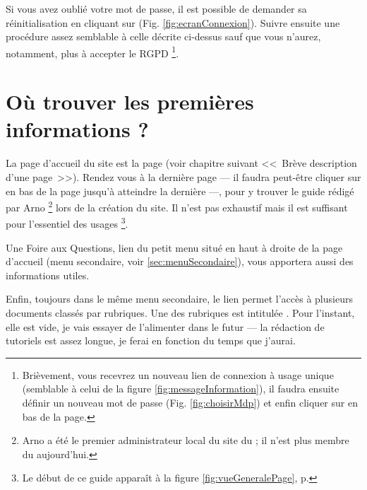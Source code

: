 
\label{sec:mdpOublie}
Si vous avez oublié votre mot de passe, il est possible de demander sa réinitialisation en cliquant sur  (Fig. \ref{fig:ecranConnexion}). Suivre ensuite une procédure assez semblable à celle décrite ci-dessus sauf que vous n’aurez, notamment, plus à accepter le RGPD%
\footnote{Brièvement, vous recevrez un nouveau lien de connexion à usage unique (semblable à celui de la figure \ref{fig:messageInformation}), il faudra ensuite définir un nouveau mot de passe (Fig. \ref{fig:choisirMdp}) et enfin cliquer sur  en bas de la page.}.


\section{Où trouver les premières informations ?}\label{page:premieresInfos}

La page d’accueil du site est la page  (voir chapitre suivant <<~Brève description d’une page~>>). Rendez vous à la dernière page --- il faudra peut-être cliquer sur   en bas de la page jusqu’à atteindre la dernière ---, pour y trouver le guide rédigé par Arno%
\footnote{Arno a été le premier administrateur local du site du \CdS; il n'est plus membre du \sel{} aujourd'hui.} 
lors de la création du site. Il n'est pas exhaustif mais il est suffisant pour l’essentiel des usages%
\footnote{Le début de ce guide apparaît à la figure \ref{fig:vueGeneralePage}, p. \pageref{fig:vueGeneralePage}}.

Une Foire aux Questions, lien  du petit menu situé en haut à droite de la page d’accueil (menu secondaire, voir \vref{sec:menuSecondaire}), vous apportera aussi des informations utiles. 

Enfin, toujours dans le même menu secondaire, le lien  permet l’accès à plusieurs documents classés par rubriques. Une  des rubriques est intitulée . Pour l’instant, elle est vide, je vais essayer de l’alimenter dans le futur --- la rédaction de tutoriels est assez longue, je ferai en fonction du temps que j'aurai.
